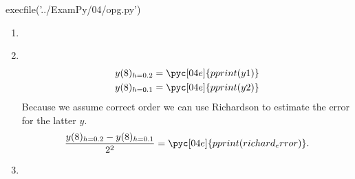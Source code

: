 \documentclass[../main.tex]{subfiles}
\begin{document}
\begin{pycode}[04e]
execfile('../ExamPy/04/opg.py')
\end{pycode}

\begin{enumerate}
	\item \\
	\item \\
		\begin{gather*}
			y(8)_{h=0.2} = \pyc[04e]{pprint(y1)}\\
			y(8)_{h=0.1} = \pyc[04e]{pprint(y2)}
		\end{gather*}
		Because we assume correct order we can use Richardson to estimate the error for the
		latter $y$. \\
		\[
			\frac{y(8)_{h=0.2}-y(8)_{h=0.1}}{2^{2}} = \pyc[04e]{pprint(richard_error)}
		.\] 
	\item\\
		\begin{figure}[h]
		\end{figure}
\end{enumerate}
	
\end{document}
